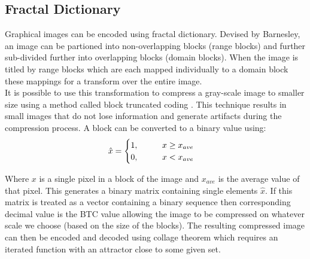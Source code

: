 \documentclass[12pt]{article}
\begin{document}
\subsection{Fractal Dictionary}
{\parindent0pt
Graphical images can be encoded using fractal dictionary.\cite{china} Devised by Barnesley, an image can be partioned into non-overlapping blocks (range blocks) and  further sub-divided further into overlapping blocks (domain blocks). When the image is titled by range blocks which are each mapped individually to a domain block these mappings for a transform over the entire image. \\

It is possible to use this transformation to compress a gray-scale image to smaller size using a method called block truncated coding \cite{china}. This technique results in small images that do not lose information and generate artifacts during the compression process. A block can be converted to a binary value using:
\begin{align*}
\hat{x} = 
\begin{cases}
1, \hspace{10mm} x \ge x_{ave}\\
0, \hspace{10mm} x <  x_{ave}
\end{cases}
\end{align*}

Where $x$ is a single pixel in a block of the image and $x_{ave}$ is the average value of that pixel. This generates a binary matrix containing single elements $\hat{x}$. If this matrix is treated as a vector containing a binary sequence then corresponding decimal value is the BTC value allowing the image to be compressed on whatever scale we choose (based on the size of the blocks). The resulting compressed image can then be encoded and decoded using collage theorem\cite{iraq} which requires an iterated function with an attractor close to some given set.

}
\end{document}
